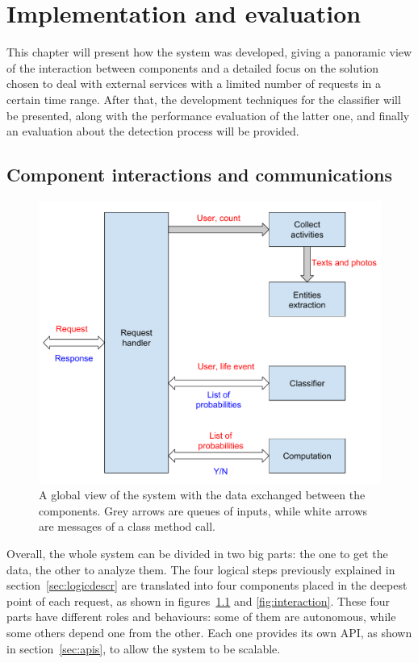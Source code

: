 \chapter{Implementation and evaluation}
\label{cha:results}
This chapter will present how the system was developed, giving a panoramic view of the interaction between components and a detailed focus on the solution chosen to deal with external services with a limited number of requests in a certain time range. After that, the development techniques for the classifier will be presented, along with the performance evaluation of the latter one, and finally an evaluation about the detection process will be provided.

\section{Component interactions and communications}
\label{sec:view}
\begin{figure}
\centering
\includegraphics[width=%
1.0\textwidth]{img/Globalview}
\caption{A global view of the system with the data exchanged between the components. Grey arrows are queues of inputs, while white arrows are messages of a class method call.}
\label{fig:globalview}
\end{figure}

Overall, the whole system can be divided in two big parts: the one to get the data, the other to analyze them. The four logical steps previously explained in section~\ref{sec:logicdescr} are translated into four components placed in the deepest point of each request, as shown in figures~\ref{fig:globalview} and \ref{fig:interaction}. These four parts have different roles and behaviours: some of them are autonomous, while some others depend one from the other. Each one provides its own API, as shown in section~\ref{sec:apis}, to allow the system to be scalable.


